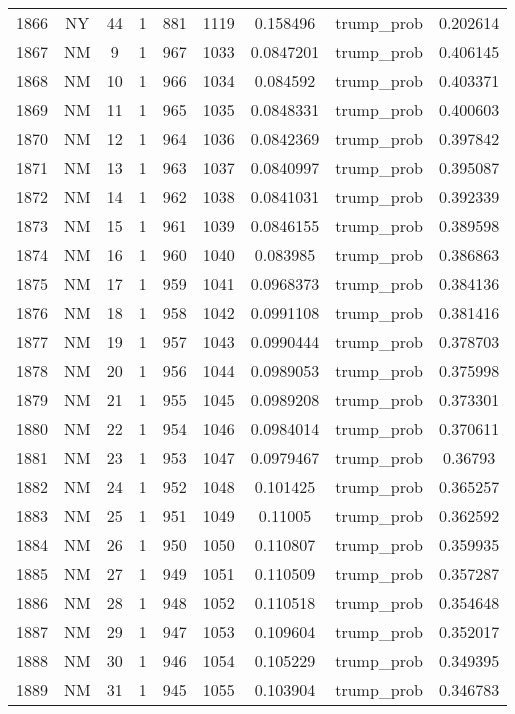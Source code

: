 \documentclass[12pt,a4paper]{article}
\begin{document}
\begin{tabular}{r|cccccccc}
	1866 & NY & 44 & 1 & 881 & 1119 & 0.158496 & trump\_prob & 0.202614 \\
	1867 & NM & 9 & 1 & 967 & 1033 & 0.0847201 & trump\_prob & 0.406145 \\
	1868 & NM & 10 & 1 & 966 & 1034 & 0.084592 & trump\_prob & 0.403371 \\
	1869 & NM & 11 & 1 & 965 & 1035 & 0.0848331 & trump\_prob & 0.400603 \\
	1870 & NM & 12 & 1 & 964 & 1036 & 0.0842369 & trump\_prob & 0.397842 \\
	1871 & NM & 13 & 1 & 963 & 1037 & 0.0840997 & trump\_prob & 0.395087 \\
	1872 & NM & 14 & 1 & 962 & 1038 & 0.0841031 & trump\_prob & 0.392339 \\
	1873 & NM & 15 & 1 & 961 & 1039 & 0.0846155 & trump\_prob & 0.389598 \\
	1874 & NM & 16 & 1 & 960 & 1040 & 0.083985 & trump\_prob & 0.386863 \\
	1875 & NM & 17 & 1 & 959 & 1041 & 0.0968373 & trump\_prob & 0.384136 \\
	1876 & NM & 18 & 1 & 958 & 1042 & 0.0991108 & trump\_prob & 0.381416 \\
	1877 & NM & 19 & 1 & 957 & 1043 & 0.0990444 & trump\_prob & 0.378703 \\
	1878 & NM & 20 & 1 & 956 & 1044 & 0.0989053 & trump\_prob & 0.375998 \\
	1879 & NM & 21 & 1 & 955 & 1045 & 0.0989208 & trump\_prob & 0.373301 \\
	1880 & NM & 22 & 1 & 954 & 1046 & 0.0984014 & trump\_prob & 0.370611 \\
	1881 & NM & 23 & 1 & 953 & 1047 & 0.0979467 & trump\_prob & 0.36793 \\
	1882 & NM & 24 & 1 & 952 & 1048 & 0.101425 & trump\_prob & 0.365257 \\
	1883 & NM & 25 & 1 & 951 & 1049 & 0.11005 & trump\_prob & 0.362592 \\
	1884 & NM & 26 & 1 & 950 & 1050 & 0.110807 & trump\_prob & 0.359935 \\
	1885 & NM & 27 & 1 & 949 & 1051 & 0.110509 & trump\_prob & 0.357287 \\
	1886 & NM & 28 & 1 & 948 & 1052 & 0.110518 & trump\_prob & 0.354648 \\
	1887 & NM & 29 & 1 & 947 & 1053 & 0.109604 & trump\_prob & 0.352017 \\
	1888 & NM & 30 & 1 & 946 & 1054 & 0.105229 & trump\_prob & 0.349395 \\
	1889 & NM & 31 & 1 & 945 & 1055 & 0.103904 & trump\_prob & 0.346783 \\

\end{tabular}
\end{document}
